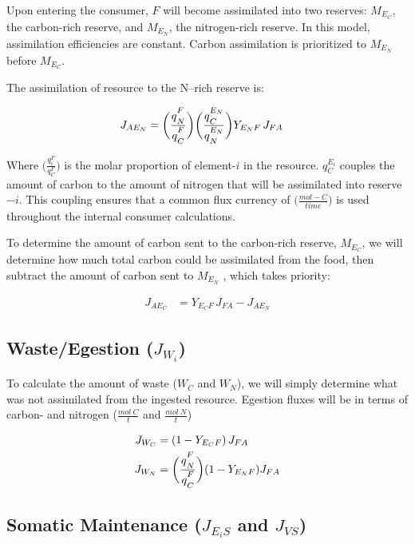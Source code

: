 \documentclass[
]{article}
\begin{document}
Upon entering the consumer, \(F\) will become assimilated into two
reserves: \(M_{E_C}\), the carbon-rich reserve, and \(M_{E_N}\), the
nitrogen-rich reserve. In this model, assimilation efficiencies are
constant. Carbon assimilation is prioritized to \(M_{E_N}\) before
\(M_{E_C}\).

The assimilation of resource to the N--rich reserve is:

\begin{align}
J_{A{E_N}} &= \biggl(\frac{q\strut_{N}^{F}}{q\strut_{C}^{F}}\biggr)\biggl(\frac{q\strut_{C}^{E_N}}{q\strut_{N}^{E_N}}\biggr)Y_{{E_N}F}\,J_{FA}
\end{align}

Where \(\biggl(\frac{q_{i}^{F}}{q_{C}^{F}}\biggr)\) is the molar
proportion of element-\(i\) in the resource. \({q_{C}^{E_i}}\) couples
the amount of carbon to the amount of nitrogen that will be assimilated
into reserve\(-i\). This coupling ensures that a common flux currency of
\(\biggl(\frac{mol-C}{time}\biggr)\) is used throughout the internal
consumer calculations.

To determine the amount of carbon sent to the carbon-rich reserve,
\(M_{E_C}\), we will determine how much total carbon could be
assimilated from the food, then subtract the amount of carbon sent to
\(M_{E_N}\) , which takes priority:

\begin{align}
J_{A{E_C}} &= Y_{{E_C}F}\,J_{FA} - J_{A{E_N}}
\end{align}

\subsection{\texorpdfstring{Waste/Egestion
(\(J_{W_i}\))}{Waste/Egestion (J\_\{W\_i\})}}\label{wasteegestion-j_w_i}

To calculate the amount of waste (\(W_C\) and \(W_N\)), we will simply
determine what was not assimilated from the ingested resource. Egestion
fluxes will be in terms of carbon- and nitrogen (\(\frac{mol\:C}{t}\)
and \(\frac{mol\:N}{t}\))

\begin{align}
J_{W_C} &= (1-Y_{{E_C}F})\,J_{FA}
\\
J_{W_N} &= \biggl(\frac{q\strut_{N}^{F}}{q\strut_{C}^{F}}\biggr)(1 - Y_{{E_N}F})J_{FA}
\end{align}

\newpage

\subsection{\texorpdfstring{Somatic Maintenance (\(J_{E_{i}S}\) and
\(J_{VS}\))}{Somatic Maintenance (J\_\{E\_\{i\}S\} and J\_\{VS\})}}\label{somatic-maintenance-j_e_is-and-j_vs}
\end{document}
